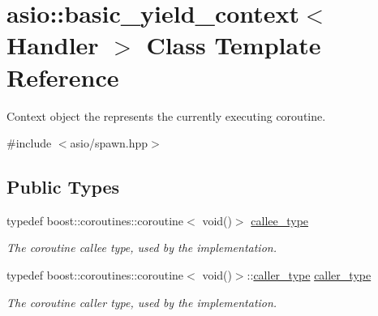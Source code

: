 \hypertarget{classasio_1_1basic__yield__context}{}\section{asio\+:\+:basic\+\_\+yield\+\_\+context$<$ Handler $>$ Class Template Reference}
\label{classasio_1_1basic__yield__context}


Context object the represents the currently executing coroutine.  




{\ttfamily \#include $<$asio/spawn.\+hpp$>$}

\subsection*{Public Types}
\begin{DoxyCompactItemize}
\item 
typedef boost\+::coroutines\+::coroutine$<$ void()$>$ \hyperlink{classasio_1_1basic__yield__context_afd9613f4a7188a89d349a3aa34b88220}{callee\+\_\+type}
\begin{DoxyCompactList}\small\item\em The coroutine callee type, used by the implementation. \end{DoxyCompactList}\item 
typedef boost\+::coroutines\+::coroutine$<$ void()$>$\+::\hyperlink{classasio_1_1basic__yield__context_a3f865e7e2e46345effce8163336f1c8e}{caller\+\_\+type} \hyperlink{classasio_1_1basic__yield__context_a3f865e7e2e46345effce8163336f1c8e}{caller\+\_\+type}
\begin{DoxyCompactList}\small\item\em The coroutine caller type, used by the implementation. \end{DoxyCompactList}\end{DoxyCompactItemize}
